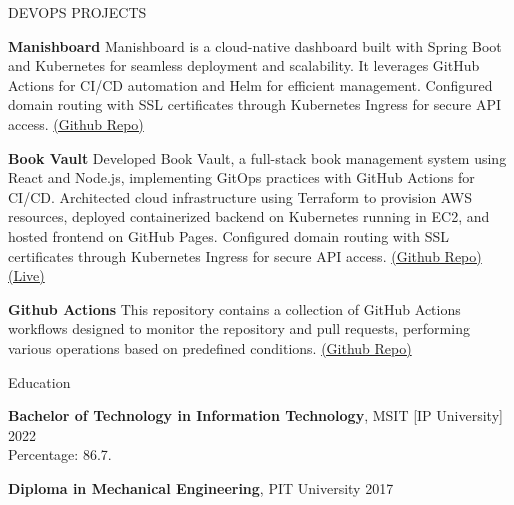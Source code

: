 \documentclass{resume} %
\begin{document}
\begin{rSection}{DEVOPS PROJECTS}
\vspace{-1.25em}
\item \textbf{Manishboard} { Manishboard is a cloud-native dashboard built with Spring Boot and Kubernetes for seamless deployment and scalability. It leverages GitHub Actions for CI/CD automation and Helm for efficient management. Configured domain routing with SSL certificates through Kubernetes Ingress for secure API access. \href{https://github.com/manishboard}{(Github Repo)}}
\item \textbf{Book Vault} { Developed Book Vault, a full-stack book management system using React and Node.js, implementing GitOps practices with GitHub Actions for CI/CD. Architected cloud infrastructure using Terraform to provision AWS resources, deployed containerized backend on Kubernetes running in EC2, and hosted frontend on GitHub Pages. Configured domain routing with SSL certificates through Kubernetes Ingress for secure API access. \href{https://github.com/book-vault}{(Github Repo)} \href{https://bookvault.manish.kr}{(Live)}}
\item \textbf{Github Actions} { This repository contains a collection of GitHub Actions workflows designed to monitor the repository and pull requests, performing various operations based on predefined conditions. \href{https://github.com/manishdotkr/github-actions}{(Github Repo)}}
\end{rSection} 

\begin{rSection}{Education}

{\bf Bachelor of Technology in Information Technology}, MSIT [IP University] \hfill {2022}\\
Percentage: 86.7.

{\bf Diploma in Mechanical Engineering}, PIT University \hfill {2017}\\

\end{rSection}
\end{document}
